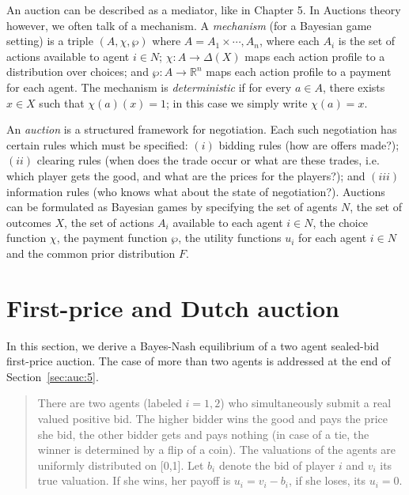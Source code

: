 An auction can be described as a mediator, like in Chapter 5.  In Auctions theory however, we often talk of a mechanism. A \emph{mechanism} (for a Bayesian game setting) is a triple $(A,\chi,\wp)$ where $A=A_1\times \cdots,A_n$, where each $A_i$ is the set of actions available to agent $i\in N$; $\chi \colon A \to \Delta(X)$ maps each action profile to a distribution over choices; and $\wp \colon A \to \mathbb{R}^n$ maps each action profile to a payment for each agent. The mechanism is \emph{deterministic} if for every $a \in A$, there exists $x \in X$ such that $\chi(a)(x)=1$; in this case we simply write $\chi(a)=x$.
%

An \emph{auction} is a structured framework for negotiation. Each such negotiation has certain rules which must be specified: $(i)$ bidding rules (how are offers made?); $(ii)$ clearing rules (when does the trade occur or what are these trades, i.e. which player gets the good, and what are the prices for the players?); and $(iii)$ information rules (who knows what about the state of negotiation?). Auctions can be formulated as Bayesian games by specifying the set of agents $N$, the set of outcomes $X$, the set of actions $A_i$ available to each agent $i \in N$, the choice function $\chi$, the payment function $\wp$, the utility functions $u_i$ for each agent $i\in N$ and the common prior distribution $F$.



\section{First-price and Dutch auction}
\label{sec:auc:3}
In this section, we derive a Bayes-Nash equilibrium of a two agent sealed-bid first-price auction. The case of more than two agents is addressed at the end of Section~\ref{sec:auc:5}.

\begin{quote}
There are two agents (labeled $i=1,2$) who simultaneously submit a real valued positive bid. The higher bidder wins the good and pays the price she bid, the other bidder gets and pays nothing (in case of a tie, the winner is determined by a flip of a coin).
%
The valuations of the agents are uniformly distributed on [0,1]. Let $b_i$ denote the bid of player $i$ and $v_i$ its true valuation. If she wins, her payoff is $u_i = v_i - b_i$, if she loses, its $u_i = 0$.
\end{quote}

